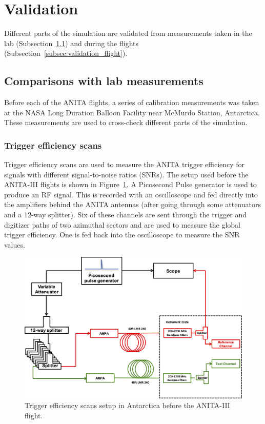 \section{Validation}
\label{sec:validation}
Different parts of the simulation are validated from measurements
taken in the lab (Subsection~\ref{subsec:validation_lab}) and during
the flights (Subsection~\ref{subsec:validation_flight}).


\subsection{Comparisons with lab measurements}
\label{subsec:validation_lab}
Before each of the ANITA flights, a series of calibration measurements was
taken at the NASA Long Duration Balloon Facility near McMurdo Station, Antarctica.
These measurements are used to cross-check different parts of the simulation.

\subsubsection{Trigger efficiency scans}
\label{subsec:validation_scans}
Trigger efficiency scans are used to measure the ANITA trigger efficiency
for signals with different signal-to-noise ratios (SNRs).
The setup used before the ANITA-III flights is shown in Figure~\ref{fig:scan_setup}. 
A Picosecond Pulse generator is used to produce an RF signal. 
This is recorded with an oscilloscope and fed directly into the
amplifiers  behind the ANITA antennas (after going through some attenuators and a 12-way splitter).
Six of these channels are sent through the trigger and digitizer paths of
two azimuthal sectors and
are used to measure the global trigger efficiency. 
One is fed back into the oscilloscope to measure the SNR values.

\begin{figure}[!h]\centering
  \includegraphics[width=.8\linewidth]{./Figs/TriggerEfficiencyScanSetup.png}
  \caption{Trigger efficiency scans setup in Antarctica before the ANITA-III flight.}
  \label{fig:scan_setup}
\end{figure}

